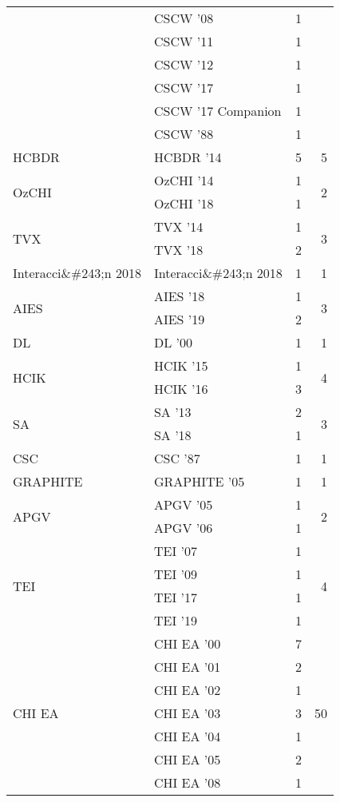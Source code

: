 \begin{table*}[t]
\begin{tabular}{llrr}
& CSCW '08 & 1 &\\
& CSCW '11 & 1 &\\
& CSCW '12 & 1 &\\
& CSCW '17 & 1 &\\
& CSCW '17 Companion & 1 &\\
& CSCW '88 & 1 &\\
\multirow{1}{*}{HCBDR } & HCBDR '14 & 5 & \multirow{1}{*}{5}\\
\multirow{2}{*}{OzCHI } & OzCHI '14 & 1 & \multirow{2}{*}{2}\\
& OzCHI '18 & 1 &\\
\multirow{2}{*}{TVX } & TVX '14 & 1 & \multirow{2}{*}{3}\\
& TVX '18 & 2 &\\
\multirow{1}{*}{Interacci\&\#243;n 2018} & Interacci\&\#243;n 2018 & 1 & \multirow{1}{*}{1}\\
\multirow{2}{*}{AIES } & AIES '18 & 1 & \multirow{2}{*}{3}\\
& AIES '19 & 2 &\\
\multirow{1}{*}{DL } & DL '00 & 1 & \multirow{1}{*}{1}\\
\multirow{2}{*}{HCIK } & HCIK '15 & 1 & \multirow{2}{*}{4}\\
& HCIK '16 & 3 &\\
\multirow{2}{*}{SA } & SA '13 & 2 & \multirow{2}{*}{3}\\
& SA '18 & 1 &\\
\multirow{1}{*}{CSC } & CSC '87 & 1 & \multirow{1}{*}{1}\\
\multirow{1}{*}{GRAPHITE } & GRAPHITE '05 & 1 & \multirow{1}{*}{1}\\
\multirow{2}{*}{APGV } & APGV '05 & 1 & \multirow{2}{*}{2}\\
& APGV '06 & 1 &\\
\multirow{4}{*}{TEI } & TEI '07 & 1 & \multirow{4}{*}{4}\\
& TEI '09 & 1 &\\
& TEI '17 & 1 &\\
& TEI '19 & 1 &\\
\multirow{19}{*}{CHI EA } & CHI EA '00 & 7 & \multirow{19}{*}{50}\\
& CHI EA '01 & 2 &\\
& CHI EA '02 & 1 &\\
& CHI EA '03 & 3 &\\
& CHI EA '04 & 1 &\\
& CHI EA '05 & 2 &\\
& CHI EA '08 & 1 &\\

\end{tabular}
\end{table*}
